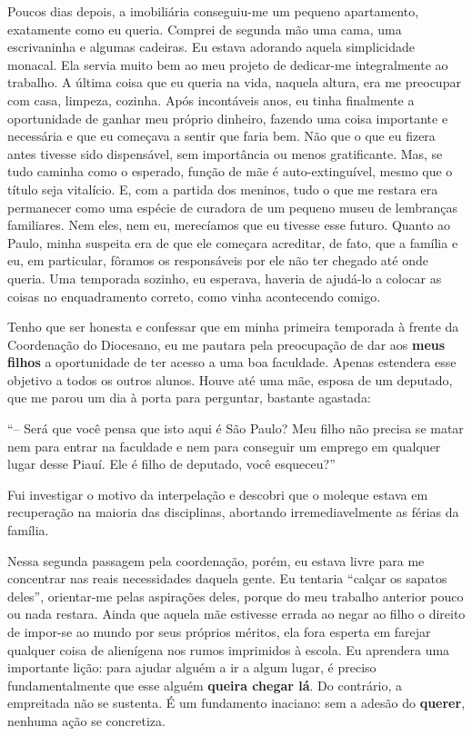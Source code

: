 Poucos dias depois, a imobiliária conseguiu-me um pequeno apartamento, exatamente como eu queria.
Comprei de segunda mão uma cama, uma escrivaninha e algumas cadeiras.
Eu estava adorando aquela simplicidade monacal.
 Ela servia muito bem ao meu projeto de dedicar-me integralmente ao trabalho.
A última coisa que eu queria na vida, naquela altura, era me preocupar com casa, limpeza, cozinha.
Após incontáveis anos, eu tinha finalmente a oportunidade de ganhar meu próprio dinheiro, fazendo uma coisa importante e necessária e que eu começava a sentir que faria bem.
Não que o que eu fizera antes tivesse sido dispensável, sem importância ou menos gratificante.
Mas, se tudo caminha como o esperado, função de mãe é auto-extinguível, mesmo que o título seja vitalício.
E, com a partida dos meninos, tudo o que me restara era permanecer como uma espécie de curadora de um pequeno museu de lembranças familiares.
Nem eles, nem eu, merecíamos que eu tivesse esse futuro.
Quanto ao Paulo, minha suspeita era de que ele começara acreditar, de fato, que a família e eu, em particular, fôramos os responsáveis por ele não ter chegado até onde queria.
Uma temporada sozinho, eu esperava, haveria de ajudá-lo a colocar as coisas no enquadramento correto, como vinha acontecendo comigo.


Tenho que ser honesta e confessar que em minha primeira temporada à frente da Coordenação do Diocesano, eu me pautara pela preocupação de dar aos \textbf{meus filhos} a oportunidade de ter acesso a uma boa faculdade.
Apenas estendera esse objetivo a todos os outros alunos.
Houve até uma mãe, esposa de um deputado, que me parou um dia à porta para perguntar, bastante agastada:

``-- Será que você pensa que isto aqui é São Paulo? Meu filho não precisa se matar nem para entrar na faculdade e nem para conseguir um emprego em qualquer lugar desse Piauí.
Ele é filho de deputado, você esqueceu?'' 

Fui investigar o motivo da interpelação e descobri que o moleque estava em recuperação na maioria das disciplinas, abortando irremediavelmente as férias da família.

Nessa segunda passagem pela coordenação, porém, eu estava livre para me concentrar nas reais necessidades daquela gente.
Eu tentaria ``calçar os sapatos deles'', orientar-me pelas aspirações deles, porque do meu trabalho anterior pouco ou nada restara.
Ainda que aquela mãe estivesse errada ao negar ao filho o direito de impor-se ao mundo por seus próprios méritos, ela fora esperta em farejar qualquer coisa de alienígena nos rumos imprimidos à escola.
Eu aprendera uma importante lição: para ajudar alguém a ir a algum lugar, é preciso fundamentalmente que esse alguém \textbf{queira chegar lá}.
Do contrário, a empreitada não se sustenta.
É um fundamento inaciano: sem a adesão do \textbf{querer}, nenhuma ação se concretiza.

